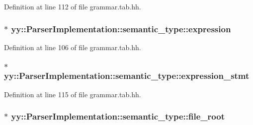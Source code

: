 Definition at line 112 of file grammar.tab.hh.

\hypertarget{unionyy_1_1_parser_implementation_1_1semantic__type_a4ea3aee40d997fea5de797910fb847e6}{
\subsubsection[{expression}]{$\ast$ {\bf yy::ParserImplementation::semantic\_\-type::expression}}}
\label{unionyy_1_1_parser_implementation_1_1semantic__type_a4ea3aee40d997fea5de797910fb847e6}


Definition at line 106 of file grammar.tab.hh.

\hypertarget{unionyy_1_1_parser_implementation_1_1semantic__type_a5c1eb97f3f49851e33c364d81dab30ee}{
\subsubsection[{expression\_\-stmt}]{$\ast$ {\bf yy::ParserImplementation::semantic\_\-type::expression\_\-stmt}}}
\label{unionyy_1_1_parser_implementation_1_1semantic__type_a5c1eb97f3f49851e33c364d81dab30ee}


Definition at line 115 of file grammar.tab.hh.

\hypertarget{unionyy_1_1_parser_implementation_1_1semantic__type_aa05842075b3fc55565ee0621843dfb24}{
\subsubsection[{file\_\-root}]{$\ast$ {\bf yy::ParserImplementation::semantic\_\-type::file\_\-root}}}
\label{unionyy_1_1_parser_implementation_1_1semantic__type_aa05842075b3fc55565ee0621843dfb24}


